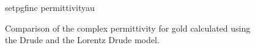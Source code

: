 \begin{figure}[ht]
\centering
{setpgfinc}
{permittivityau}
\caption{Comparison of the complex permittivity for gold calculated using the Drude
and the Lorentz Drude model.}
\label{fig:permittivityau}
\end{figure}

